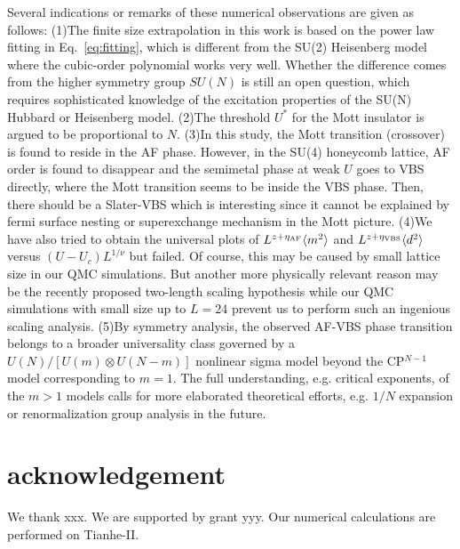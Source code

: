 \documentclass[twocolumn,superscriptaddress]{revtex4-1}
\begin{document}
Several indications or remarks of these numerical observations are given as follows: 
(1)The finite size extrapolation in this work is based on the power law fitting in Eq.~\ref{eq:fitting}, which is different from the SU(2) Heisenberg model where the cubic-order polynomial works very well. \cite{Neuberger_PRB_1989,*Sandvik_PRB_1997} Whether the difference comes from the higher symmetry group $SU(N)$ is still an open question, which requires sophisticated knowledge of the excitation properties of the SU(N) Hubbard or Heisenberg model. 
(2)The threshold $U^*$ for the Mott insulator is argued to be proportional to $N$. \cite{Zhou_PRB_2016}
(3)In this study, the Mott transition (crossover) is found to reside in the AF phase. However, in the SU(4) honeycomb lattice, AF order is found to disappear and the semimetal phase at weak $U$ goes to VBS directly, where the Mott transition seems to be inside the VBS phase. \cite{Zhou_PRB_2016} Then, there should be a Slater-VBS which is interesting since it cannot be explained by fermi surface nesting or superexchange mechanism in the Mott picture. 
(4)We have also tried to obtain the universal plots of $L^{z+\eta_{\rm AF}}\langle m^2 \rangle$ and $L^{z+\eta_{\rm VBS}}\langle d^2 \rangle$ versus $(U-U_c)L^{1/\nu}$ but failed. Of course, this may be caused by small lattice size in our QMC simulations. But another more physically relevant reason may be the recently proposed two-length scaling hypothesis \cite{Shao_S_2016} while our QMC simulations with small size up to $L=24$ prevent us to perform such an ingenious scaling analysis.
(5)By symmetry analysis, the observed AF-VBS phase transition belongs to a broader universality class governed by a $U(N)/[U(m)\otimes U(N-m)]$ nonlinear sigma model beyond the CP$^{N-1}$ model corresponding to $m=1$. The full understanding, e.g. critical exponents, of the $m>1$ models calls for more elaborated theoretical efforts, e.g. $1/N$ expansion \cite{Wang_a_2018} or renormalization group analysis in the future.


\section{acknowledgement}
We thank xxx.
We are supported by grant yyy.
Our numerical calculations are performed on Tianhe-II. 


\end{document}
